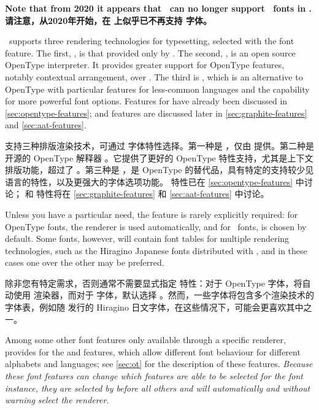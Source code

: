 \documentclass[a4paper]{l3doc}
\begin{document}
\textbf{Note that from 2020 it appears that \XeTeX\ can no longer support \AAT\ fonts in \MacOSX.\\请注意，从2020年开始，在 \MacOSX 上似乎已不再支持 \AAT 字体。}

\XeTeX\ supports three rendering technologies for typesetting, selected with
the  font feature. The first, , is
that provided only by \MacOSX.
The second, , is an open source OpenType interpreter.
It provides greater support for OpenType features, notably contextual arrangement, over .
The third is , which is an alternative to OpenType with particular features for less-common languages and the capability for more powerful font options.
Features for  have already been discussed in \vref{sec:opentype-features};
 and  features are discussed later in \vref{sec:graphite-features} and \vref{sec:aat-features}.

\XeTeX 支持三种排版渲染技术，可通过  字体特性选择。第一种是 ，仅由 \MacOSX 提供。第二种是开源的 OpenType 解释器 。它提供了更好的 OpenType 特性支持，尤其是上下文排版功能，超过了 。第三种是 ，是 OpenType 的替代品，具有特定的支持较少见语言的特性，以及更强大的字体选项功能。 特性已在 \vref{sec:opentype-features} 中讨论； 和  特性将在 \vref{sec:graphite-features} 和 \vref{sec:aat-features} 中讨论。

Unless you have a particular need, the  feature is rarely explicitly required: for OpenType
fonts, the  renderer is used automatically, and for \AAT\ fonts,
 is chosen by default. Some fonts, however, will contain font tables
for multiple rendering technologies, such as the Hiragino Japanese fonts
distributed with \MacOSX, and in these cases one over the other may be preferred.

除非您有特定需求，否则通常不需要显式指定  特性：对于 OpenType 字体，将自动使用  渲染器，而对于 \AAT 字体，默认选择 。然而，一些字体将包含多个渲染技术的字体表，例如随 \MacOSX 发行的 Hiragino 日文字体，在这些情况下，可能会更喜欢其中之一。

Among some other font features only available through a specific renderer,
 provides for the  and  features, which allow
different font behaviour for different alphabets and languages; see \vref{sec:ot}
for the description of these features. {\em Because these font features can
change which features are able to be selected for the font instance, they are selected
by  before all others and will automatically and without warning
select the  renderer.}
\end{document}
